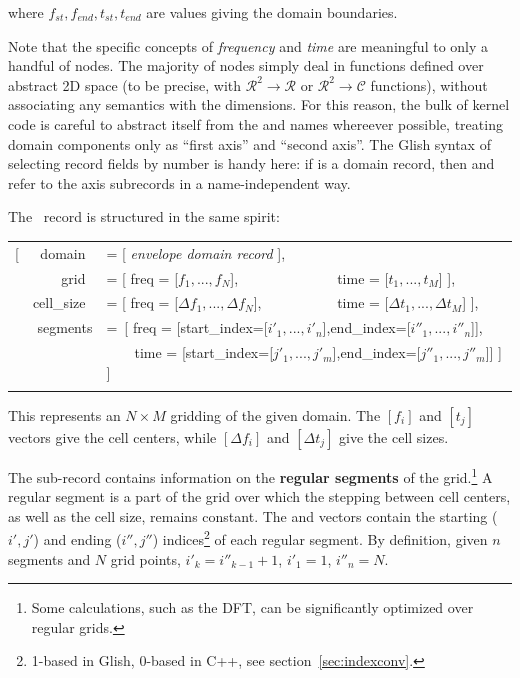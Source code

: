 \documentclass[10pt,twoside]{book}
\begin{document}
  where $f_{st},f_{end},t_{st},t_{end}$ are  values giving the domain
  boundaries.

  Note that the specific concepts of {\em frequency} and {\em time} are
  meaningful to only a handful of nodes. The majority of nodes simply deal in
  functions defined over abstract 2D space (to be precise, with 
  $\mathcal{R}^2\rightarrow\mathcal{R}$ or
  $\mathcal{R}^2\rightarrow\mathcal{C}$ functions), without associating any
  semantics with the dimensions. For this reason, the bulk of kernel code is
  careful to abstract itself from the  and  names whereever
  possible, treating domain components only as ``first axis'' and ``second
  axis''. The Glish syntax of selecting record fields by number is handy here:
  if  is a domain record, then  and  refer to the
  axis subrecords in a name-independent way.

  The \Cells\ record is structured in the same spirit:
  
  {\tt\begin{tabular}{lrl@{}l}
  [ &domain~&     = [ {\em envelope domain record} ],\\
    &grid~&       = [ freq = [$f_1,...,f_N$],~&~time = [$t_1,...,t_M$] ],\\
    &cell\_size~& = [ freq = [$\Delta f_1,...,\Delta f_N$],~&~time = 
                              [$\Delta t_1,...,\Delta t_M$] ],\\
    &segments&\multicolumn{2}{l}{=~[ freq =
    [start\_index=[$i'_1,...,i'_n$],end\_index=[$i''_1,...,i''_n$]],}\\
              &&\multicolumn{2}{l}{~~~~time =
              [start\_index=[$j'_1,...,j'_m$],end\_index=[$j''_1,...,j''_m$]] ] ]}\\
  \\ 
  \end{tabular}}
  
  This represents an $N\times M$ gridding of the given domain. The $[f_i]$ and
  $[t_j]$ vectors give the cell centers, while $[\Delta f_i]$ and $[\Delta
  t_j]$ give the cell sizes. 
  
  The  sub-record contains information on the {\bf regular
  segments} of the grid.\footnote{Some calculations, such as the DFT, can be
  significantly optimized over regular grids.} A regular segment is a part of
  the grid over which the stepping between cell centers, as well as the cell
  size, remains constant. The  and  vectors
  contain the starting ($i',j'$) and ending ($i'',j''$)
  indices\footnote{1-based in Glish, 0-based in C++, see
  section~\ref{sec:indexconv}.} of each regular segment.
  By definition, given $n$ segments and $N$ grid points, $i'_{k}= i''_{k-1}+1$,
  $i'_1=1$, $i''_n=N.$
\end{document}
